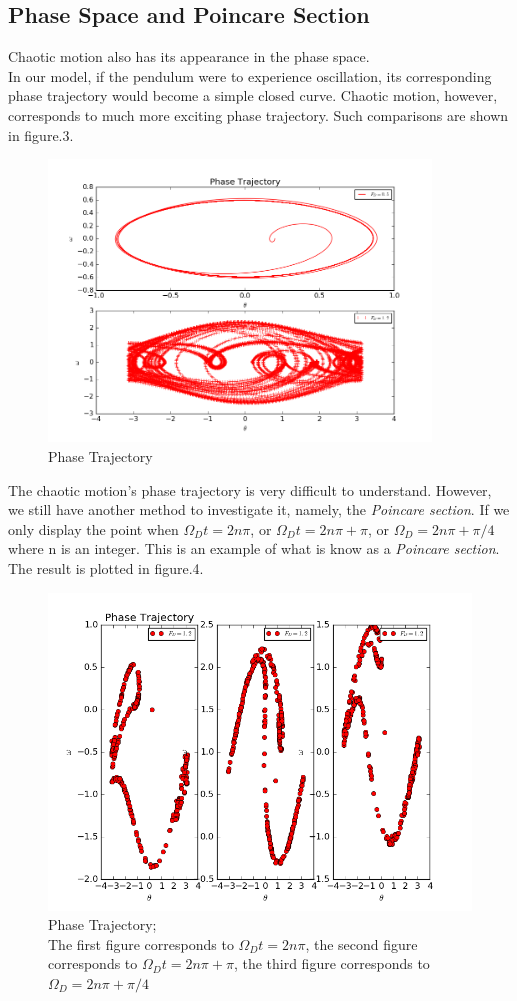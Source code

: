 \documentclass[10pt,a4paper]{article}
\begin{document}
   \subsection{Phase Space and Poincare Section}
   Chaotic motion also has its appearance in the phase space.\\
   In our model, if the pendulum were to experience oscillation, its corresponding phase trajectory would become a simple closed curve. Chaotic motion, however, corresponds to much more exciting phase trajectory. Such comparisons are shown in figure.3.\\
    \begin{figure}[htbp]
    	\centering
    	\includegraphics[width=4in]{chaotic_pend4.png}
    	\caption{Phase Trajectory}
    \end{figure}
   The chaotic motion's phase trajectory is very difficult to understand. However, we still have another method to investigate it, namely, the \emph{Poincare section}. If we only display the point when $\Omega_Dt=2n\pi$, or $\Omega_Dt=2n\pi+\pi$, or $\Omega_D=2n\pi+\pi/4$ where n is an integer. This is an example of what is know as a \emph{Poincare section}. The result is plotted in figure.4.
    \begin{figure}[htbp]
    	\centering
    	\includegraphics[width=5in]{chaotic_pend5.png}
    	\caption{Phase Trajectory;\protect\\The first figure corresponds to $\Omega_Dt=2n\pi$, the second figure corresponds to $\Omega_Dt=2n\pi+\pi$, the third figure corresponds to $\Omega_D=2n\pi+\pi/4$}
    \end{figure}
    
\end{document}
